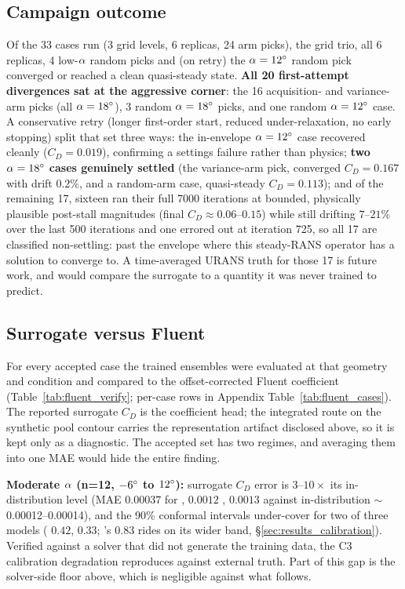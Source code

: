 \begin{widetable}
  
\end{widetable}

\subsection{Campaign outcome}
\label{sec:fluent_outcome}
Of the 33 cases run (3 grid levels, 6 replicas, 24 arm picks), the grid trio,
all 6 replicas, 4 low-$\alpha$ random picks and (on retry) the $\alpha=12^{\circ}$
random pick converged or reached a clean quasi-steady state. \textbf{All 20
first-attempt divergences sat at the aggressive corner}: the 16 acquisition-
and variance-arm picks (all $\alpha=18^{\circ}$), 3 random $\alpha=18^{\circ}$
picks, and one random $\alpha=12^{\circ}$ case. A conservative retry (longer
first-order start, reduced under-relaxation, no early stopping) split that
set three ways: the in-envelope $\alpha=12^{\circ}$ case recovered cleanly
($C_D=0.019$), confirming a settings failure rather than physics; \textbf{two
$\alpha=18^{\circ}$ cases genuinely settled} (the variance-arm pick, converged
$C_D=0.167$ with
drift $0.2\%$, and a random-arm case, quasi-steady $C_D=0.113$); and of the
remaining 17,
sixteen ran their
full 7000 iterations at bounded, physically plausible post-stall magnitudes
(final $C_D\approx0.06$--$0.15$) while still drifting $7$--$21\%$ over the
last 500 iterations and one errored out at iteration 725, so all 17 are
classified non-settling: past the envelope
where this steady-RANS operator has a solution to converge to. A
time-averaged URANS truth for those 17 is future work, and would compare the
surrogate to a quantity it was never trained to predict.

\subsection{Surrogate versus Fluent}
\label{sec:fluent_compare}
For every accepted case the trained ensembles were evaluated at that geometry
and condition and compared to the offset-corrected Fluent coefficient
(Table~\ref{tab:fluent_verify}; per-case rows in
Appendix Table~\ref{tab:fluent_cases}). The reported surrogate $C_D$ is the
coefficient head; the integrated route on the synthetic pool contour carries
the representation artifact disclosed above, so it is kept only as a
diagnostic. The accepted set has two regimes, and averaging them into one MAE
would hide the entire finding.

\textbf{Moderate $\alpha$ (n=12, $-6^{\circ}$ to $12^{\circ}$):} surrogate
$C_D$ error is $3$--$10\times$ its in-distribution level (MAE $0.00037$ for
\Mgnn, $0.0012$ \Mtrans, $0.0013$ \Mfno{} against in-distribution
$\sim$0.00012--0.00014), and the 90\% conformal intervals under-cover for
two of three models (\Mtrans{} $0.42$, \Mfno{} $0.33$; \Mgnn's $0.83$ rides
on its wider band, \S\ref{sec:results_calibration}). Verified against a
solver that did not generate the training data, the C3 calibration
degradation reproduces against external truth. Part of this gap is the
solver-side floor above, which is negligible against what follows.

